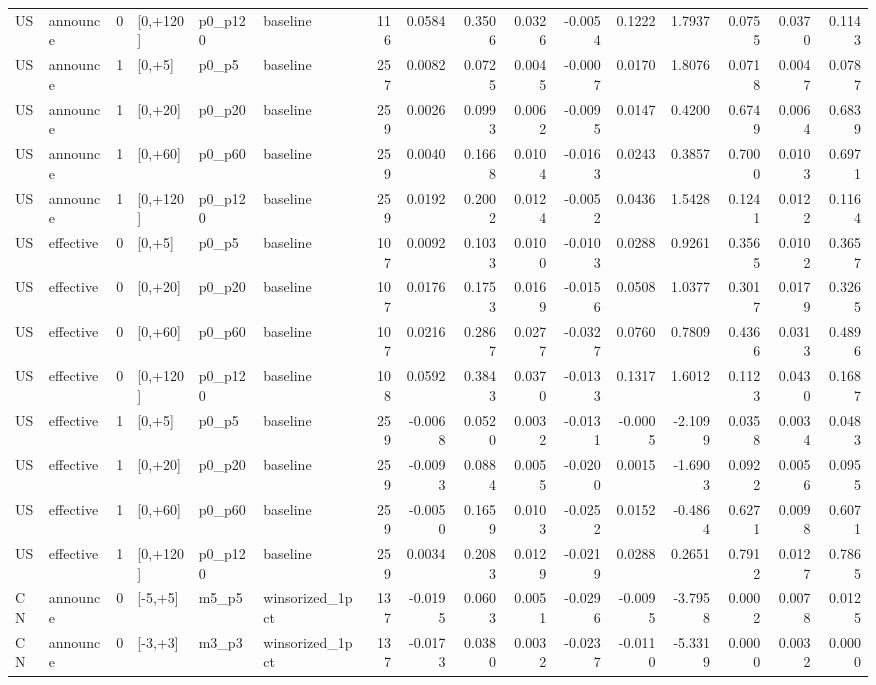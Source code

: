 \begin{tabular}{llrlllrrrrrrrrrr}
US & announce & 0 & [0,+120] & p0_p120 & baseline & 116 & 0.0584 & 0.3506 & 0.0326 & -0.0054 & 0.1222 & 1.7937 & 0.0755 & 0.0370 & 0.1143 \\
US & announce & 1 & [0,+5] & p0_p5 & baseline & 257 & 0.0082 & 0.0725 & 0.0045 & -0.0007 & 0.0170 & 1.8076 & 0.0718 & 0.0047 & 0.0787 \\
US & announce & 1 & [0,+20] & p0_p20 & baseline & 259 & 0.0026 & 0.0993 & 0.0062 & -0.0095 & 0.0147 & 0.4200 & 0.6749 & 0.0064 & 0.6839 \\
US & announce & 1 & [0,+60] & p0_p60 & baseline & 259 & 0.0040 & 0.1668 & 0.0104 & -0.0163 & 0.0243 & 0.3857 & 0.7000 & 0.0103 & 0.6971 \\
US & announce & 1 & [0,+120] & p0_p120 & baseline & 259 & 0.0192 & 0.2002 & 0.0124 & -0.0052 & 0.0436 & 1.5428 & 0.1241 & 0.0122 & 0.1164 \\
US & effective & 0 & [0,+5] & p0_p5 & baseline & 107 & 0.0092 & 0.1033 & 0.0100 & -0.0103 & 0.0288 & 0.9261 & 0.3565 & 0.0102 & 0.3657 \\
US & effective & 0 & [0,+20] & p0_p20 & baseline & 107 & 0.0176 & 0.1753 & 0.0169 & -0.0156 & 0.0508 & 1.0377 & 0.3017 & 0.0179 & 0.3265 \\
US & effective & 0 & [0,+60] & p0_p60 & baseline & 107 & 0.0216 & 0.2867 & 0.0277 & -0.0327 & 0.0760 & 0.7809 & 0.4366 & 0.0313 & 0.4896 \\
US & effective & 0 & [0,+120] & p0_p120 & baseline & 108 & 0.0592 & 0.3843 & 0.0370 & -0.0133 & 0.1317 & 1.6012 & 0.1123 & 0.0430 & 0.1687 \\
US & effective & 1 & [0,+5] & p0_p5 & baseline & 259 & -0.0068 & 0.0520 & 0.0032 & -0.0131 & -0.0005 & -2.1099 & 0.0358 & 0.0034 & 0.0483 \\
US & effective & 1 & [0,+20] & p0_p20 & baseline & 259 & -0.0093 & 0.0884 & 0.0055 & -0.0200 & 0.0015 & -1.6903 & 0.0922 & 0.0056 & 0.0955 \\
US & effective & 1 & [0,+60] & p0_p60 & baseline & 259 & -0.0050 & 0.1659 & 0.0103 & -0.0252 & 0.0152 & -0.4864 & 0.6271 & 0.0098 & 0.6071 \\
US & effective & 1 & [0,+120] & p0_p120 & baseline & 259 & 0.0034 & 0.2083 & 0.0129 & -0.0219 & 0.0288 & 0.2651 & 0.7912 & 0.0127 & 0.7865 \\
CN & announce & 0 & [-5,+5] & m5_p5 & winsorized_1pct & 137 & -0.0195 & 0.0603 & 0.0051 & -0.0296 & -0.0095 & -3.7958 & 0.0002 & 0.0078 & 0.0125 \\
CN & announce & 0 & [-3,+3] & m3_p3 & winsorized_1pct & 137 & -0.0173 & 0.0380 & 0.0032 & -0.0237 & -0.0110 & -5.3319 & 0.0000 & 0.0032 & 0.0000 \\

\end{tabular}
